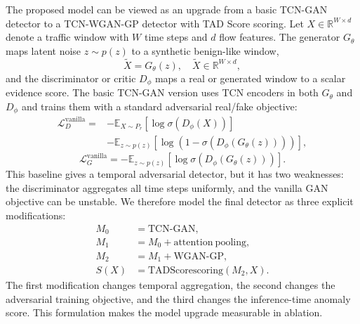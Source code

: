 \documentclass[conference]{IEEEtran}
\newcommand{\tad}{TAD Score}
\begin{document}
The proposed model can be viewed as an upgrade from a basic TCN-GAN detector to a TCN-WGAN-GP detector with \tad{} scoring. Let $X\in\mathbb{R}^{W\times d}$ denote a traffic window with $W$ time steps and $d$ flow features. The generator $G_\theta$ maps latent noise $z\sim p(z)$ to a synthetic benign-like window,
\begin{equation}
  \tilde{X}=G_\theta(z), \quad \tilde{X}\in\mathbb{R}^{W\times d},
\end{equation}
and the discriminator or critic $D_\phi$ maps a real or generated window to a scalar evidence score. The basic TCN-GAN version uses TCN encoders in both $G_\theta$ and $D_\phi$ and trains them with a standard adversarial real/fake objective:
\begin{align}
  \mathcal{L}^{\mathrm{vanilla}}_D =
  &-\mathbb{E}_{X\sim P_r}[\log \sigma(D_\phi(X))] \nonumber\\
  &-\mathbb{E}_{z\sim p(z)}[\log(1-\sigma(D_\phi(G_\theta(z))))],
\end{align}
\begin{equation}
  \mathcal{L}^{\mathrm{vanilla}}_G =
  -\mathbb{E}_{z\sim p(z)}[\log \sigma(D_\phi(G_\theta(z)))].
\end{equation}
This baseline gives a temporal adversarial detector, but it has two weaknesses: the discriminator aggregates all time steps uniformly, and the vanilla GAN objective can be unstable. We therefore model the final detector as three explicit modifications:
\begin{equation}
\begin{aligned}
  M_0 &= \mathrm{TCN\text{-}GAN},\\
  M_1 &= M_0 + \mathrm{attention\ pooling},\\
  M_2 &= M_1 + \mathrm{WGAN\text{-}GP},\\
  S(X) &= \mathrm{\tad{} scoring}(M_2, X).
\end{aligned}
\end{equation}
The first modification changes temporal aggregation, the second changes the adversarial training objective, and the third changes the inference-time anomaly score. This formulation makes the model upgrade measurable in ablation.
\end{document}
